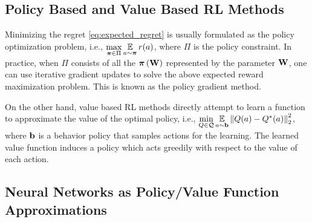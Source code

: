 
\subsection{Policy Based and Value Based RL Methods}

Minimizing the regret \cref{eq:expected_regret} is usually formulated as the policy optimization problem, i.e., $\max\limits_{{\boldsymbol{\pi}} \in \Pi}{ \operatorname*{{\mathbb{E}}}\limits_{ a \sim {\boldsymbol{\pi}} }{ r(a)} }$, where $\Pi$ is the policy constraint. In practice, when $\Pi$ consists of all the ${\boldsymbol{\pi}}\left({\mathbf{W}}\right)$ represented by the parameter ${\mathbf{W}}$, one can use iterative gradient updates to solve the above expected reward maximization problem. This is known as the policy gradient method.

On the other hand, value based RL methods directly attempt to learn a function to approximate the value of the optimal policy, i.e., $\min\limits_{Q \in {\mathcal{Q}}}{ \operatorname*{{\mathbb{E}}}\limits_{a \sim {\mathbf{b}}}{ \left\| Q(a) - Q^*(a) \right\|_2^2 }}$, where ${\mathbf{b}}$ is a behavior policy that samples actions for the learning. The learned value function induces a policy which acts greedily with respect to the value of each action.

\subsection{Neural Networks as Policy/Value Function Approximations}
\label{subsec:nn_value_policy}
 


